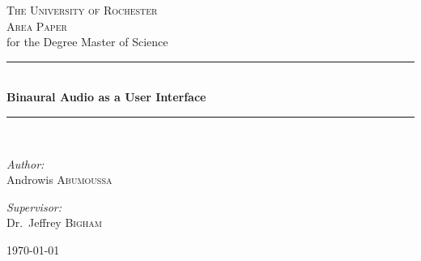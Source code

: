 \documentclass[12pt]{report}
\newcommand{\HRule}{\rule{\linewidth}{0.5mm}}
\begin{document}
\begin{titlepage}
\begin{center}

\textsc{\LARGE The University of Rochester}
\\[5.5cm]

\textsc{\Large Area Paper}\\
for the Degree Master of Science
\\[0.5cm]

\HRule \\[0.4cm]
{ \large \bfseries Binaural Audio as a User Interface }\\[0.4cm]

\HRule \\[0.5cm]

\begin{minipage}{0.4\textwidth}
\begin{flushleft} \large
\emph{Author:}\\
Androwis \textsc{Abumoussa}
\end{flushleft}
\end{minipage}
\begin{minipage}{0.4\textwidth}
\begin{flushright} \large
\emph{Supervisor:} \\
Dr.~Jeffrey \textsc{Bigham}
\end{flushright}
\end{minipage}

\vfill

{\large \today}

\end{center}
\end{titlepage}



\renewcommand{\thepage }{\roman{page}}                         \tableofcontents



\newpage \thispagestyle{empty} \quad
\end{document}
